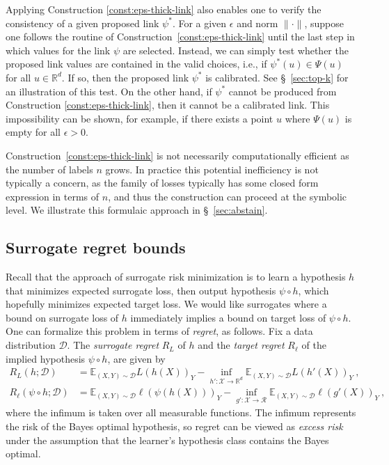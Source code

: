 \documentclass[twoside,11pt]{article}
\newcommand{\Comments}{1}
\newcommand{\mytodo}[2]{\ifnum\Comments=1%
  \todo[linecolor=#1!80!black,backgroundcolor=#1,bordercolor=#1!80!black]{#2}\fi}
\newcommand{\raft}[1]{\mytodo{green!20!white}{RF: #1}}
\newcommand{\jessiet}[1]{\mytodo{teal!20!white}{JF: #1}}
\newcommand{\reals}{\mathbb{R}}
\newcommand{\D}{\mathcal{D}}
\newcommand{\E}{\mathbb{E}}
\newcommand{\R}{\mathcal{R}}
\newcommand{\X}{\mathcal{X}}
\begin{document}
Applying Construction \ref{const:eps-thick-link} also enables one to verify the consistency of a given proposed link $\psi^*$.
For a given $\epsilon$ and norm $\|\cdot\|$, suppose one follows the routine of Construction~\ref{const:eps-thick-link} until the last step in which values for the link $\psi$ are selected.
Instead, we can simply test whether the proposed link values are contained in the valid choices, i.e., if $\psi^*(u) \in \Psi(u)$ for all $u\in\reals^d$.
If so, then the proposed link $\psi^*$ is calibrated.
See \S~\ref{sec:top-k} for an illustration of this test.
On the other hand, if $\psi^*$ cannot be produced from Construction \ref{const:eps-thick-link}, then it cannot be a calibrated link.
This impossibility can be shown, for example, if there exists a point $u$ where $\Psi(u)$ is empty for all $\epsilon > 0$.

Construction~\ref{const:eps-thick-link} is not necessarily computationally efficient as the number of labels $n$ grows.
In practice this potential inefficiency is not typically a concern, as the family of losses typically has some closed form expression in terms of $n$, and thus the construction can proceed at the symbolic level.
We illustrate this formulaic approach in \S~\ref{sec:abstain}.

\subsection{Surrogate regret bounds}\label{subsec:regret-bounds}
Recall that the approach of surrogate risk minimization is to learn a hypothesis $h$ that minimizes expected surrogate loss, then output hypothesis $\psi \circ h$, which hopefully minimizes expected target loss.
We would like surrogates where a bound on surrogate loss of $h$ immediately implies a bound on target loss of $\psi \circ h$.
One can formalize this problem in terms of \emph{regret}, as follows.
Fix a data distribution $\D$.
The \emph{surrogate regret} $R_L$ of $h$ and the \emph{target regret} $R_{\ell}$ of the implied hypothesis $\psi \circ h$, are given by
\begin{align*}
  R_L(h;\D) &= \E_{(X,Y)\sim\D} L(h(X))_Y - \inf_{h':\X\to\reals^d} \E_{(X,Y)\sim\D} L(h'(X))_Y~,
  \\
  R_\ell(\psi\circ h;\D) &= \E_{(X,Y)\sim\D} \ell(\psi(h(X)))_Y - \inf_{g':\X\to\R} \E_{(X,Y)\sim\D} \ell(g'(X))_Y~,
\end{align*}
where the infimum is taken over all measurable functions.
The infimum represents the risk of the Bayes optimal hypothesis, so regret can be viewed as \emph{excess risk} under the assumption that the learner's hypothesis class contains the Bayes optimal.
\end{document}
